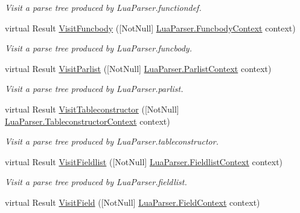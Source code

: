\begin{DoxyCompactItemize}
\begin{DoxyCompactList}\small\item\em Visit a parse tree produced by Lua\+Parser.\+functiondef. \end{DoxyCompactList}\item 
virtual Result \mbox{\hyperlink{classzlua_1_1_lua_base_visitor_a489f2fe8dfd967614367a84330275c33}{Visit\+Funcbody}} (\mbox{[}Not\+Null\mbox{]} \mbox{\hyperlink{classzlua_1_1_lua_parser_1_1_funcbody_context}{Lua\+Parser.\+Funcbody\+Context}} context)
\begin{DoxyCompactList}\small\item\em Visit a parse tree produced by Lua\+Parser.\+funcbody. \end{DoxyCompactList}\item 
virtual Result \mbox{\hyperlink{classzlua_1_1_lua_base_visitor_a2dc2a658f068fc6064d256d3c19b1b0d}{Visit\+Parlist}} (\mbox{[}Not\+Null\mbox{]} \mbox{\hyperlink{classzlua_1_1_lua_parser_1_1_parlist_context}{Lua\+Parser.\+Parlist\+Context}} context)
\begin{DoxyCompactList}\small\item\em Visit a parse tree produced by Lua\+Parser.\+parlist. \end{DoxyCompactList}\item 
virtual Result \mbox{\hyperlink{classzlua_1_1_lua_base_visitor_a3af0cdb6e39f83c4cd04b9a309b9f130}{Visit\+Tableconstructor}} (\mbox{[}Not\+Null\mbox{]} \mbox{\hyperlink{classzlua_1_1_lua_parser_1_1_tableconstructor_context}{Lua\+Parser.\+Tableconstructor\+Context}} context)
\begin{DoxyCompactList}\small\item\em Visit a parse tree produced by Lua\+Parser.\+tableconstructor. \end{DoxyCompactList}\item 
virtual Result \mbox{\hyperlink{classzlua_1_1_lua_base_visitor_a743339d1d6b13b9a3c334604cbae43e0}{Visit\+Fieldlist}} (\mbox{[}Not\+Null\mbox{]} \mbox{\hyperlink{classzlua_1_1_lua_parser_1_1_fieldlist_context}{Lua\+Parser.\+Fieldlist\+Context}} context)
\begin{DoxyCompactList}\small\item\em Visit a parse tree produced by Lua\+Parser.\+fieldlist. \end{DoxyCompactList}\item 
virtual Result \mbox{\hyperlink{classzlua_1_1_lua_base_visitor_a4088fd943be175aab9ed0830ce42127f}{Visit\+Field}} (\mbox{[}Not\+Null\mbox{]} \mbox{\hyperlink{classzlua_1_1_lua_parser_1_1_field_context}{Lua\+Parser.\+Field\+Context}} context)

\end{DoxyCompactItemize}
